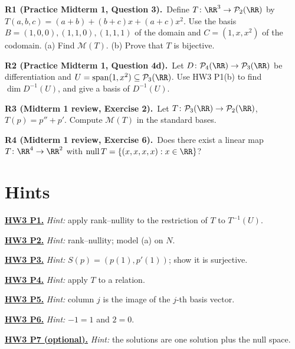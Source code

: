 \documentclass[10pt]{scrartcl}
\DeclareMathOperator{\spn}{span}\DeclareMathOperator{\nul}{null}\DeclareMathOperator{\range}{range}
\newcommand{\PP}{\mathcal P}\newcommand{\LL}{\mathcal L}\newcommand{\MM}{\mathcal M}
\begin{document}
\begin{prob}\textbf{R1 (Practice Midterm 1, Question 3).}\ Define $T\colon\RR^3\to\PP_2(\RR)$ by $T(a,b,c)=(a+b)+(b+c)x+(a+c)x^2$. Use the basis $B=(1,0,0),(1,1,0),(1,1,1)$ of the domain and $C=(1,x,x^2)$ of the codomain. (a) Find $\MM(T)$. (b) Prove that $T$ is bijective.
\end{prob}
\begin{prob}\textbf{R2 (Practice Midterm 1, Question 4d).}\ Let $D\colon\PP_4(\RR)\to\PP_3(\RR)$ be differentiation and $U=\spn(1,x^2)\subseteq\PP_3(\RR)$. Use HW3 P1(b) to find $\dim D^{-1}(U)$, and give a basis of $D^{-1}(U)$.
\end{prob}
\begin{prob}\textbf{R3 (Midterm 1 review, Exercise 2).}\ Let $T\colon\PP_3(\RR)\to\PP_2(\RR)$, $T(p)=p''+p'$. Compute $\MM(T)$ in the standard bases.
\end{prob}
\begin{prob}\textbf{R4 (Midterm 1 review, Exercise 6).}\ Does there exist a linear map $T\colon\RR^4\to\RR^2$ with $\nul T=\{(x,x,x,x):x\in\RR\}$?
\end{prob}

\section*{Hints}

\par\medskip\noindent\textbf{\hyperlink{prob-HW3-P1}{HW3 P1.}} \emph{Hint:} apply rank--nullity to the restriction of $T$ to $T^{-1}(U)$.

\par\medskip\noindent\textbf{\hyperlink{prob-HW3-P2}{HW3 P2.}} \emph{Hint:} rank--nullity; model (a) on $N$.

\par\medskip\noindent\textbf{\hyperlink{prob-HW3-P3}{HW3 P3.}} \emph{Hint:} $S(p)=(p(1),p'(1))$; show it is surjective.

\par\medskip\noindent\textbf{\hyperlink{prob-HW3-P4}{HW3 P4.}} \emph{Hint:} apply $T$ to a relation.

\par\medskip\noindent\textbf{\hyperlink{prob-HW3-P5}{HW3 P5.}} \emph{Hint:} column $j$ is the image of the $j$-th basis vector.

\par\medskip\noindent\textbf{\hyperlink{prob-HW3-P6}{HW3 P6.}} \emph{Hint:} $-1=1$ and $2=0$.

\par\medskip\noindent\textbf{\hyperlink{prob-HW3-P7}{HW3 P7 (optional).}} \emph{Hint:} the solutions are one solution plus the null space.
\end{document}
